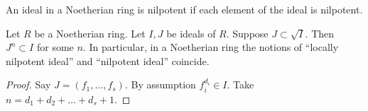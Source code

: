 \begin{lemma}
\label{lemma-Noetherian-power}
\begin{slogan}
An ideal in a Noetherian ring is nilpotent if each element
of the ideal is nilpotent.
\end{slogan}
Let $R$ be a Noetherian ring. Let $I, J$ be ideals of $R$.
Suppose $J \subset \sqrt{I}$. Then $J^n \subset I$ for some $n$.
In particular, in a Noetherian ring the notions of
``locally nilpotent ideal''
and ``nilpotent ideal'' coincide.
\end{lemma}

\begin{proof}
Say $J = (f_1, \ldots, f_s)$.
By assumption $f_i^{d_i} \in I$.
Take $n = d_1 + d_2 + \ldots + d_s + 1$.
\end{proof}